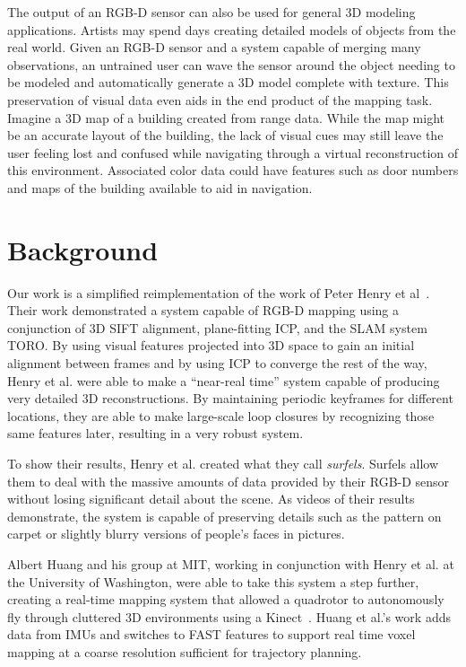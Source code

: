 \documentclass[letterpaper, 10pt, conference]{ieeeconf}
\begin{document}
The output of an RGB-D sensor can also be used for general 3D modeling
applications. Artists may spend days creating detailed models of objects from
the real world. Given an RGB-D sensor and a system capable of merging many
observations, an untrained user can wave the sensor around the object needing
to be modeled and automatically generate a 3D model complete with texture.
This preservation of visual data even aids in the end product of the mapping
task. Imagine a 3D map of a building created from range data. While the map
might be an accurate layout of the building, the lack of visual cues may still
leave the user feeling lost and confused while navigating through a virtual
reconstruction of this environment. Associated color data could
have features such as door numbers and maps of the building available to aid
in navigation.

\section{Background}
Our work is a simplified reimplementation of the work of Peter Henry et
al~\cite{Henry2010rgbd}. Their work demonstrated a system capable of RGB-D
mapping using a conjunction of 3D SIFT alignment, plane-fitting ICP, and the
SLAM system TORO. By using visual features projected into 3D space to gain an
initial alignment between frames and by using ICP to converge the rest of the
way, Henry et al. were able to make a ``near-real time'' system capable of
producing very detailed 3D reconstructions. By maintaining periodic keyframes
for different locations, they are able to make large-scale loop closures by
recognizing those same features later, resulting in a very robust system.

To show their results, Henry et al. created what they call \emph{surfels}.
Surfels allow them to deal with the massive amounts of data provided by their
RGB-D sensor without losing significant detail about the scene. As videos of
their results demonstrate, the system is capable of preserving details such as
the pattern on carpet or slightly blurry versions of people's faces in
pictures.

Albert Huang and his group at MIT, working in conjunction with Henry et al. at
the University of Washington, were able to take this system a step further,
creating a real-time mapping system that allowed a quadrotor to autonomously
fly through cluttered 3D environments using a Kinect~\cite{Huang2011isrr}.
Huang et al.'s work adds data from IMUs and switches to FAST features to
support real time voxel mapping at a coarse resolution sufficient for
trajectory planning.
\end{document}
